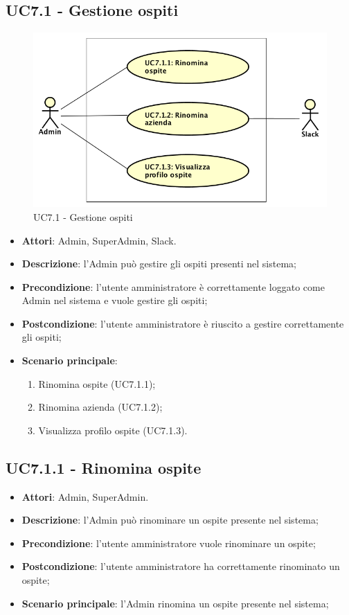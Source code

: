 \documentclass[../AnalisiDeiRequisiti_v3.0.0.tex]{subfiles}
\begin{document}
\subsection{UC7.1 - Gestione ospiti} 
\label{sssec:UC7.1} 
\begin{figure}[!h]
	\centering
	\includegraphics[width=\textwidth]{UseCases/UC7_GestionePannelloAdmin/UC7_1_GestioneOspiti/UC7_1_GestioneOspiti.png}
	\caption{UC7.1 - Gestione ospiti}
\end{figure}
\begin{itemize} 
\item \textbf{Attori}: Admin, SuperAdmin, Slack.
\item \textbf{Descrizione}: l'Admin può gestire gli ospiti presenti nel sistema;
\item \textbf{Precondizione}: l'utente amministratore è correttamente loggato come Admin nel sistema e vuole gestire gli ospiti;
\item \textbf{Postcondizione}: l'utente amministratore è riuscito a gestire correttamente gli ospiti;
\item \textbf{Scenario principale}: \begin{enumerate}\item Rinomina ospite (UC7.1.1);\item Rinomina azienda (UC7.1.2);\item Visualizza profilo ospite (UC7.1.3). 
 \end{enumerate}
\end{itemize} 
\subsection{UC7.1.1 - Rinomina ospite} 
\label{sssec:UC7.1.1} 
\begin{itemize} 
\item \textbf{Attori}: Admin, SuperAdmin.
\item \textbf{Descrizione}: l'Admin può rinominare un ospite presente nel sistema;
\item \textbf{Precondizione}: l'utente amministratore vuole rinominare un ospite;
\item \textbf{Postcondizione}: l'utente amministratore ha correttamente rinominato un ospite;
\item \textbf{Scenario principale}: l'Admin rinomina un ospite presente nel sistema;
\end{itemize} 
\end{document}

